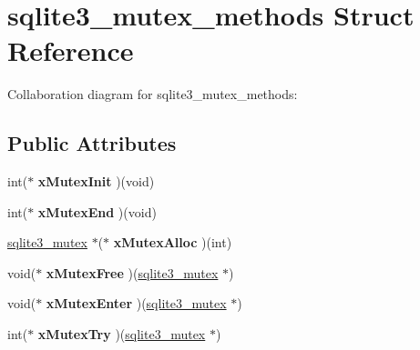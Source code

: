 \hypertarget{structsqlite3__mutex__methods}{}\section{sqlite3\+\_\+mutex\+\_\+methods Struct Reference}
\label{structsqlite3__mutex__methods}


Collaboration diagram for sqlite3\+\_\+mutex\+\_\+methods\+:
\subsection*{Public Attributes}
\begin{DoxyCompactItemize}
\item 
int($\ast$ {\bfseries x\+Mutex\+Init} )(void)\hypertarget{structsqlite3__mutex__methods_af0a78d79b6029444d4a2ac7c474030d4}{}\label{structsqlite3__mutex__methods_af0a78d79b6029444d4a2ac7c474030d4}

\item 
int($\ast$ {\bfseries x\+Mutex\+End} )(void)\hypertarget{structsqlite3__mutex__methods_a4963efb4bfede244d4d2a14510dbfe68}{}\label{structsqlite3__mutex__methods_a4963efb4bfede244d4d2a14510dbfe68}

\item 
\hyperlink{structsqlite3__mutex}{sqlite3\+\_\+mutex} $\ast$($\ast$ {\bfseries x\+Mutex\+Alloc} )(int)\hypertarget{structsqlite3__mutex__methods_a1092d5c1659c494c5235e884def5e275}{}\label{structsqlite3__mutex__methods_a1092d5c1659c494c5235e884def5e275}

\item 
void($\ast$ {\bfseries x\+Mutex\+Free} )(\hyperlink{structsqlite3__mutex}{sqlite3\+\_\+mutex} $\ast$)\hypertarget{structsqlite3__mutex__methods_a4e58d446a7225ce91073eb0af91d219a}{}\label{structsqlite3__mutex__methods_a4e58d446a7225ce91073eb0af91d219a}

\item 
void($\ast$ {\bfseries x\+Mutex\+Enter} )(\hyperlink{structsqlite3__mutex}{sqlite3\+\_\+mutex} $\ast$)\hypertarget{structsqlite3__mutex__methods_ac60f7bb165e9770949a8a2b2c2632830}{}\label{structsqlite3__mutex__methods_ac60f7bb165e9770949a8a2b2c2632830}

\item 
int($\ast$ {\bfseries x\+Mutex\+Try} )(\hyperlink{structsqlite3__mutex}{sqlite3\+\_\+mutex} $\ast$)\hypertarget{structsqlite3__mutex__methods_a45682df41bdfcb267a696090c80ebd06}{}\label{structsqlite3__mutex__methods_a45682df41bdfcb267a696090c80ebd06}


\end{DoxyCompactItemize}
